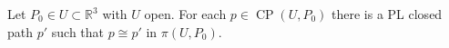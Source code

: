 Let $P_0 \in U \subset \mathbb{R}^3$ with $U$ open. For each $p \in \operatorname{CP}(U, P_0)$ there is a PL closed path $p'$ such that $p \cong p'$ in $\pi(U, P_0)$.
